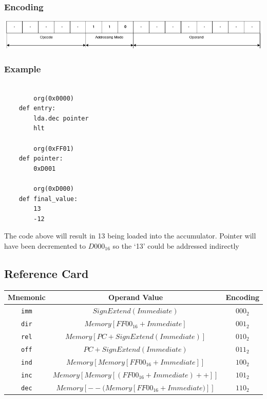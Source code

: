 \subsubsection{Encoding}
\begin{center}
    \includegraphics[scale=0.40]{img/Andromeda-DEC.drawio}
\end{center}

\subsubsection{Example}
\begin{verbatim}

        org(0x0000)
    def entry:
        lda.dec pointer
        hlt

        org(0xFF01)
    def pointer:
        0xD001

        org(0xD000)
    def final_value:
        13
        -12

\end{verbatim}
The code above will result in 13 being loaded into the accumulator.
Pointer will have been decremented to $D000_{16}$ so the `13' could be addressed indirectly
\pagebreak

\subsection{Reference Card}\label{subsec:reference-card}
\renewcommand{\arraystretch}{2.0}
\begin{center}
    \begin{adjustbox}{width=\textwidth}
        \begin{tabular}{ |c|c|c| }
            \hline
            Mnemonic & Operand Value & Encoding \\ \hline
            \texttt{imm} & $SignExtend(Immediate)$ & $000_{2}$ \\ \hline
            \texttt{dir} & $Memory[FF00_{16} + Immediate]$ & $001_{2}$\\ \hline
            \texttt{rel} & $Memory[PC + SignExtend(Immediate)]$ & $010_{2}$\\ \hline
            \texttt{off} & $PC + SignExtend(Immediate)$ & $011_{2}$\\ \hline
            \texttt{ind} & $Memory[Memory[FF00_{16} + Immediate]]$ & $100_{2}$\\ \hline
            \texttt{inc} & $Memory[Memory[(FF00_{16} + Immediate)++]]$ & $101_{2}$\\ \hline
            \texttt{dec} & $Memory[--(Memory[FF00_{16} + Immediate)]]$ & $110_{2}$\\ \hline
        \end{tabular}
    \end{adjustbox}
\end{center}

